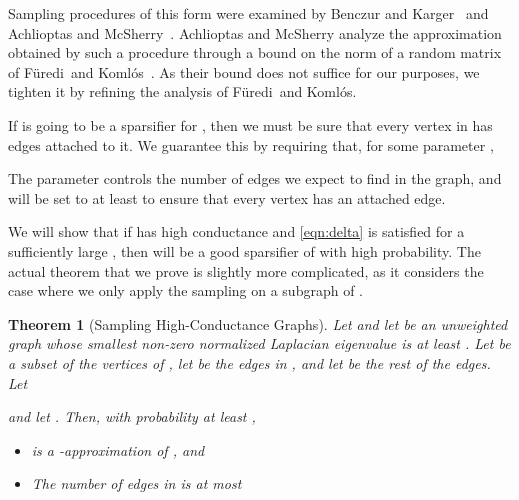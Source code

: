 \documentclass[11pt]{article}
\newtheorem{theorem}{Theorem}[section]
\newcommand{\Furedi}{F{\"u}redi}
\newcommand{\Komlos}{Koml{\'o}s}
\begin{document}
Sampling procedures of this form were examined by Benczur and Karger~\cite{BenczurKarger}
  and Achlioptas and McSherry~\cite{AchlioptasMcSherry}.
Achlioptas and McSherry analyze the approximation obtained by such a procedure
  through a bound on the norm of a random matrix
  of \Furedi \ and \Komlos~\cite{FurediKomlos}.
As their bound does not suffice for our purposes, we tighten it by
  refining the analysis of \Furedi \  and \Komlos.

If  is going to be a sparsifier for , then we must be sure
  that every vertex in  has edges attached to it.
We guarantee this by requiring that, for some parameter ,

The parameter  controls the number of edges we expect to find
  in the graph, and will be set to at least 
  to ensure that every vertex has an attached edge.

We will show that if  has high conductance and
 \eqref{eqn:delta} is satisfied for a sufficiently large ,
 then  will be a good sparsifier of  with high probability.
The actual theorem that we prove is slightly more complicated,
  as it considers the case where we only apply the sampling
  on a subgraph of .

\begin{theorem}[Sampling High-Conductance Graphs]\label{thm:sampling}
Let  and
  let  be an unweighted graph  whose smallest non-zero normalized Laplacian
  eigenvalue is at least .
Let  be a subset of the vertices of , let  be the edges in ,
  and let  be the rest of the edges.
Let

and let .
Then, with probability at least ,
\begin{itemize}
\item [(S.1)]  is a -approximation of , and
\item [(S.2)] The number of edges in  is at most

\end{itemize}
\end{theorem}


\vskip 0.2in
\noindent
{}
\vskip 0.2in
\end{document}
